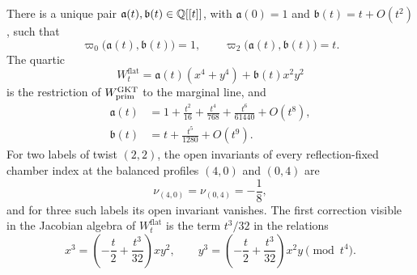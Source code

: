 \begin{theorem}
\label{thm:marginal-calibration}
There is a unique pair $\mathfrak a(t),\mathfrak b(t)\in\mathbb Q[[t]]$, with $\mathfrak a(0)=1$ and
$\mathfrak b(t)=t+O(t^2)$, such that
\begin{equation}\label{eq:period-inverse}
 \varpi_0\bigl(\mathfrak a(t),\mathfrak b(t)\bigr)=1,
 \qquad \varpi_2\bigl(\mathfrak a(t),\mathfrak b(t)\bigr)=t.
\end{equation}
The quartic
\[
 W_t^{\mathrm{flat}}=\mathfrak a(t)(x^4+y^4)+\mathfrak b(t)x^2y^2
\]
is the restriction of $W^{\mathrm{GKT}}_{\mathrm{prim}}$ to the marginal line, and
\begin{align}
 \mathfrak a(t)&=1+\frac{t^2}{16}+\frac{t^4}{768}
       +\frac{t^6}{61440}+O(t^8),\label{eq:A-series}\\
 \mathfrak b(t)&=t+\frac{t^5}{1280}+O(t^9).\label{eq:B-series}
\end{align}
For two labels of twist $(2,2)$, the open invariants of every
reflection-fixed chamber index at the balanced profiles $(4,0)$ and $(0,4)$
are
\begin{equation}\label{eq:marginal-invariants}
 \nu_{(4,0)}=\nu_{(0,4)}=-\frac18,
\end{equation}
and for three such labels its open invariant vanishes.  The first
correction visible in the Jacobian algebra of $W^{\mathrm{flat}}_t$ is the
term $t^3/32$ in the relations
\begin{equation}\label{eq:marginal-product}
 x^3=\left(-\frac t2+\frac{t^3}{32}\right)xy^2,
 \qquad
 y^3=\left(-\frac t2+\frac{t^3}{32}\right)x^2y
 \pmod{t^4}.
\end{equation}
\end{theorem}


